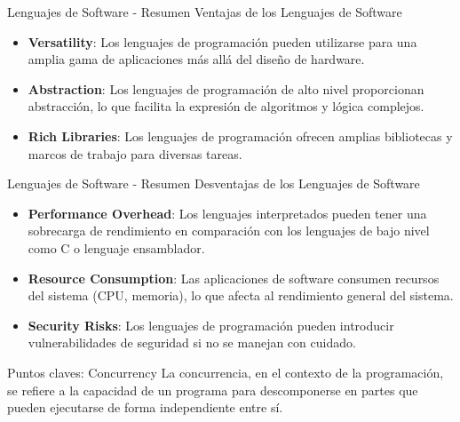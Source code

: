 \documentclass[11pt]{beamer}
\begin{document}
\begin{frame}{Lenguajes de Software - Resumen}
	Ventajas de los Lenguajes de Software\newline
	\begin{itemize}
		\item \textbf{Versatility}: Los lenguajes de programación pueden utilizarse para una amplia gama de aplicaciones más allá del diseño de hardware.
		\item \textbf{Abstraction}: Los lenguajes de programación de alto nivel proporcionan abstracción, lo que facilita la expresión de algoritmos y lógica complejos.
		\item \textbf{Rich Libraries}: Los lenguajes de programación ofrecen amplias bibliotecas y marcos de trabajo para diversas tareas.
	\end{itemize}
\end{frame}

\begin{frame}{Lenguajes de Software - Resumen}
	Desventajas de los Lenguajes de Software\newline
	\begin{itemize}
		\item \textbf{Performance Overhead}: Los lenguajes interpretados pueden tener una sobrecarga de rendimiento en comparación con los lenguajes de bajo nivel como C o lenguaje ensamblador.
		\item \textbf{Resource Consumption}: Las aplicaciones de software consumen recursos del sistema (CPU, memoria), lo que afecta al rendimiento general del sistema.
		\item \textbf{Security Risks}: Los lenguajes de programación pueden introducir vulnerabilidades de seguridad si no se manejan con cuidado.
	\end{itemize}
\end{frame}

\begin{frame}{Puntos claves: Concurrency}
	La concurrencia, en el contexto de la programación, se refiere a la capacidad de un programa para descomponerse en partes que pueden ejecutarse de forma independiente entre sí.
\end{frame}
\end{document}
